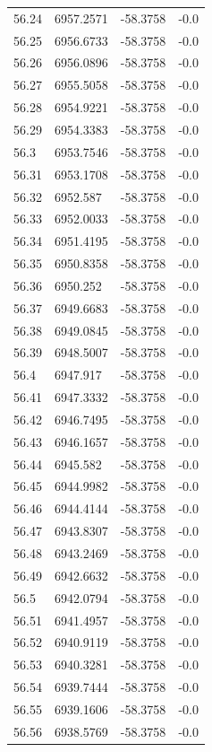 \begin{table}[H]
\begin{tabular}{llll}
56.24 & 6957.2571 & -58.3758 & -0.0 \\
56.25 & 6956.6733 & -58.3758 & -0.0 \\
56.26 & 6956.0896 & -58.3758 & -0.0 \\
56.27 & 6955.5058 & -58.3758 & -0.0 \\
56.28 & 6954.9221 & -58.3758 & -0.0 \\
56.29 & 6954.3383 & -58.3758 & -0.0 \\
56.3 & 6953.7546 & -58.3758 & -0.0 \\
56.31 & 6953.1708 & -58.3758 & -0.0 \\
56.32 & 6952.587 & -58.3758 & -0.0 \\
56.33 & 6952.0033 & -58.3758 & -0.0 \\
56.34 & 6951.4195 & -58.3758 & -0.0 \\
56.35 & 6950.8358 & -58.3758 & -0.0 \\
56.36 & 6950.252 & -58.3758 & -0.0 \\
56.37 & 6949.6683 & -58.3758 & -0.0 \\
56.38 & 6949.0845 & -58.3758 & -0.0 \\
56.39 & 6948.5007 & -58.3758 & -0.0 \\
56.4 & 6947.917 & -58.3758 & -0.0 \\
56.41 & 6947.3332 & -58.3758 & -0.0 \\
56.42 & 6946.7495 & -58.3758 & -0.0 \\
56.43 & 6946.1657 & -58.3758 & -0.0 \\
56.44 & 6945.582 & -58.3758 & -0.0 \\
56.45 & 6944.9982 & -58.3758 & -0.0 \\
56.46 & 6944.4144 & -58.3758 & -0.0 \\
56.47 & 6943.8307 & -58.3758 & -0.0 \\
56.48 & 6943.2469 & -58.3758 & -0.0 \\
56.49 & 6942.6632 & -58.3758 & -0.0 \\
56.5 & 6942.0794 & -58.3758 & -0.0 \\
56.51 & 6941.4957 & -58.3758 & -0.0 \\
56.52 & 6940.9119 & -58.3758 & -0.0 \\
56.53 & 6940.3281 & -58.3758 & -0.0 \\
56.54 & 6939.7444 & -58.3758 & -0.0 \\
56.55 & 6939.1606 & -58.3758 & -0.0 \\
56.56 & 6938.5769 & -58.3758 & -0.0 \\

\end{tabular}
\end{table}
